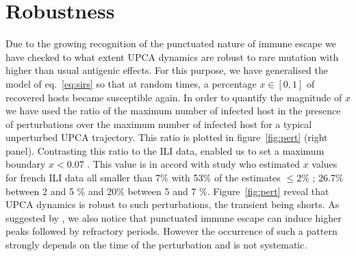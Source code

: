 \documentclass[12pt]{article}
\begin{document}
\section{Robustness}
\label{sec:robustness}

Due to the growing recognition of the punctuated nature of immune
escape \citep{Cobey2008} we have checked to what extent UPCA dynamics
are robust to rare mutation with higher than usual antigenic
effects. For this purpose, we have generalised the model of
eq.~\eqref{eq:sirs} so that at random times, a percentage $x \in
[0,1]$ of recovered hosts became susceptible again. In order to
quantify the magnitude of $x$ we have used the ratio of the maximum
number of infected host in the presence of perturbations over the
maximum number of infected host for a typical unperturbed UPCA
trajectory. This ratio is plotted in figure~\ref{fig:pert} (right
panel).  Contrasting this ratio to the ILI data, enabled us to set a
maximum boundary $x<0.07$ . This value is in accord with
\citep{Finkenstaedt2005} study who estimated $x$ values for french ILI
data all smaller than 7\% with 53\% of the estimates $\leq 2\%$ ;
26.7\% between 2 and 5 \% and 20\% between 5 and 7 \%.
Figure~\ref{fig:pert} reveal that UPCA dynamics is robust to such
perturbations, the transient being shorts.  As suggested by
\citep{Koelle2006}, we also notice that punctuated immune escape can
induce higher peaks followed by refractory periods. However the
occurrence of such a pattern strongly depends on the time of the
perturbation and is not systematic.
\end{document}
